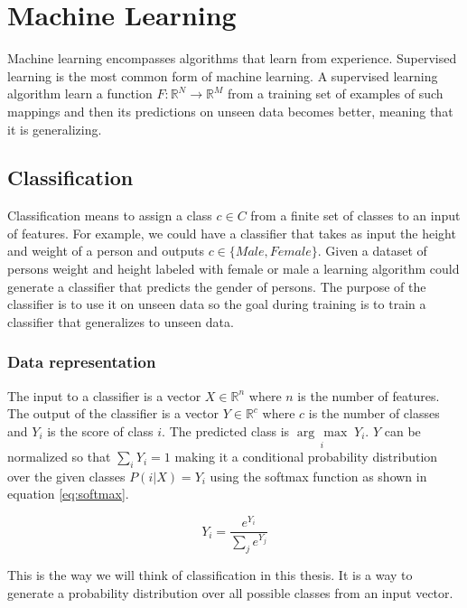 \documentclass{kththesis}
\begin{document}
\section{Machine Learning}
Machine learning  encompasses algorithms that learn from experience. Supervised learning is the most common form of machine learning. A supervised learning algorithm learn a function $F: \mathbb{R}^{N} \rightarrow \mathbb{R}^{M}$ from a training set of examples of such mappings and then its predictions on unseen data becomes better, meaning that it is generalizing. 

\subsection{Classification}
Classification means to assign a class $c \in C$ from a finite set  of classes to an input of features. For example, we could have a classifier that takes as input  the height and weight of a person and outputs $c \in \{Male, Female\}$. Given a dataset of persons weight and height  labeled with female or male  a  learning algorithm could generate a classifier that predicts the gender of persons.  The purpose of the classifier is to use it on unseen data so the goal during training is to train a classifier that generalizes to unseen data.

\newcommand{\argmax}[1]{\underset{#1}{\operatorname{arg}\,\operatorname{max}}\;}
\subsubsection{Data representation}
\label{sec:machine_learning:data_representation}
The input to a classifier is a vector $X \in \mathbb{R}^{n}$ where $n$ is the  number of features.
The output of the classifier is a vector $Y \in \mathbb{R}^{c}$ where $c$ is the number of classes and $Y_{i}$ is the score of class $i$. The predicted class is $\argmax{i}Y_{i}$. $Y$ can be normalized so that $\sum_{i}Y_{i}=1$ making it a conditional probability distribution over the given classes $P(i|X)=Y_i$ using the softmax function as shown in equation \ref{eq:softmax}. 

\begin{equation}
\label{eq:softmax}
Y_i=\frac{e^{Y_i}}{\sum_j{e^{Y_j}}}
\end{equation}

This is the way we will think of classification in this thesis. It is a way to generate a probability distribution over all possible classes from an input vector.
\end{document}
